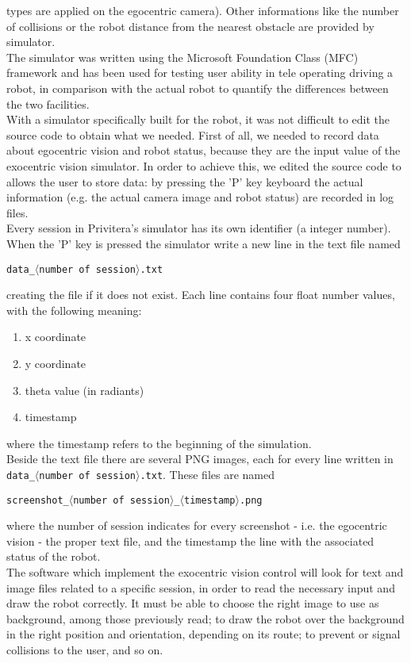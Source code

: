 types are applied on the egocentric camera). Other informations 
like the number of collisions or the robot distance from the 
nearest obstacle are provided by simulator.
\\
The simulator was written using the Microsoft Foundation Class
(MFC) framework and has been used for testing user ability in
tele operating driving a robot, in comparison with the actual 
robot to quantify the differences between the two facilities. 
\\
With a simulator specifically built for the \morduc{} robot, it 
was not difficult to edit the source code to obtain what we 
needed. First of all, we needed to record data about egocentric 
vision and robot status, because they are the input value 
of the exocentric vision simulator. In order to achieve this, 
we edited the source code to allows the user to store data: by 
pressing the 'P' key keyboard the actual information (e.g. the 
actual camera image and robot status) are recorded in log files.
\\
Every session in Privitera's simulator has its own identifier 
(a integer number). When the 'P' key is pressed the simulator 
write a new line in the text file named

\begin{center}
  \texttt{data\_$\langle$number of session$\rangle$.txt}
\end{center}

creating the file if it does not 
exist. Each line contains four float number values, with the 
following meaning:

\begin{enumerate}
\item x coordinate
\item y coordinate
\item theta value (in radiants)
\item timestamp
\end{enumerate}

where the timestamp refers to the beginning of the simulation.
\\
Beside the text file there are several PNG images, each for every 
line written in \texttt{data\_$\langle$number of 
session$\rangle$.txt}.
These files are named

\begin{center}
  \texttt{screenshot\_$\langle$number of 
    session$\rangle$\_$\langle$timestamp$\rangle$.png}
\end{center}

where the 
number of session indicates for every screenshot 
- i.e. the egocentric vision - the proper text file, and the 
timestamp the line with the associated status of the robot.
\\
The software which implement the exocentric vision control 
will look for text and image files related to a specific 
session, in order to read the necessary input and draw the 
robot correctly. It must be able to choose the right image 
to use as background, among those previously read; to draw 
the robot over the background in the right position and 
orientation, depending on its route; to prevent or signal 
collisions to the user, and so on.

